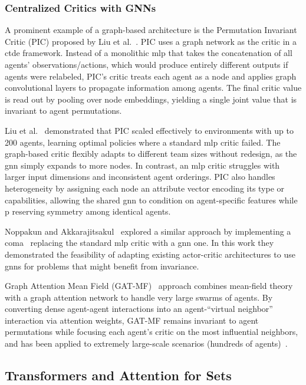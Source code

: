 \subsubsection{Centralized Critics with GNNs}
A prominent example of a graph-based architecture is the Permutation 
Invariant Critic (PIC) proposed by Liu et al.~\cite{liu2020b}. 
PIC uses a graph network as the critic in a \gls{ctde} framework. 
Instead of a monolithic \gls{mlp} that takes the concatenation of 
all agents' observations/actions, which would produce entirely different 
outputs if agents were relabeled, PIC's critic treats each agent as a node 
and applies graph convolutional layers to propagate information among agents. 
The final critic value is read out by pooling over node embeddings, 
yielding a single joint value that is invariant to agent permutations. 

Liu et al.~\cite{liu2020b} demonstrated that PIC scaled effectively 
to environments with up to 200 agents, learning optimal policies where 
a standard \gls{mlp} critic failed. The graph-based critic flexibly adapts to 
different team sizes without redesign, as the \gls{gnn} simply expands to more nodes. 
In contrast, an \gls{mlp} critic struggles with larger input dimensions 
and inconsistent agent orderings. PIC also handles heterogeneity by 
assigning each node an attribute vector encoding its type or capabilities, 
allowing the shared \gls{gnn} to condition on agent-specific features while p
reserving symmetry among identical agents.

Noppakun and Akkarajitsakul~\cite{noppakun2022} explored a similar
approach by implementing a \gls{coma}~\cite{foerster2018}
replacing the standard \gls{mlp} critic with a \gls{gnn} one.
In this work they demonstrated the feasibility of adapting
existing actor-critic architectures to use \glspl{gnn}
for problems that might benefit from invariance.

Graph Attention Mean Field (GAT-MF)~\cite{hao2023} approach combines mean-field 
theory with a graph attention network to handle very large swarms of agents. 
By converting dense agent-agent interactions into an agent-“virtual neighbor” 
interaction via attention weights, GAT-MF remains invariant to agent permutations 
while focusing each agent's critic on the most influential neighbors, 
and has been applied to extremely large-scale scenarios (hundreds of agents)~\cite{hao2022}.


\subsection{Transformers and Attention for Sets}

